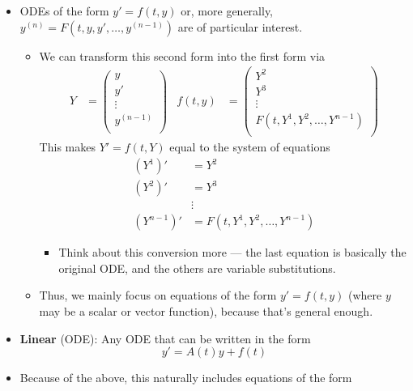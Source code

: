 \documentclass[../notes.tex]{subfiles}
\begin{document}
\begin{itemize}
    \item ODEs of the form $y'=f(t,y)$ or, more generally, $y^{(n)}=F(t,y,y',\dots,y^{(n-1)})$ are of particular interest.
    \begin{itemize}
        \item We can transform this second form into the first form via
        \begin{align*}
            Y &=
            \begin{pmatrix}
                y\\
                y'\\
                \vdots\\
                y^{(n-1)}\\
            \end{pmatrix}&
            f(t,y) &=
            \begin{pmatrix}
                Y^2\\
                Y^3\\
                \vdots\\
                F(t,Y^1,Y^2,\dots,Y^{n-1})\\
            \end{pmatrix}
        \end{align*}
        This makes $Y'=f(t,Y)$ equal to the system of equations
        \begin{align*}
            (Y^1)' &= Y^2\\
            (Y^2)' &= Y^3\\
            &\vdots\\
            (Y^{n-1})' &= F(t,Y^1,Y^2,\dots,Y^{n-1})
        \end{align*}
        \begin{itemize}
            \item Think about this conversion more --- the last equation is basically the original ODE, and the others are variable substitutions.
        \end{itemize}
        \item Thus, we mainly focus on equations of the form $y'=f(t,y)$ (where $y$ may be a scalar or vector function), because that's general enough.
    \end{itemize}
    \item \textbf{Linear} (ODE): Any ODE that can be written in the form
    \begin{equation*}
        y' = A(t)y+f(t)
    \end{equation*}
    \item Because of the above, this naturally includes equations of the form

\end{itemize}
\end{document}
